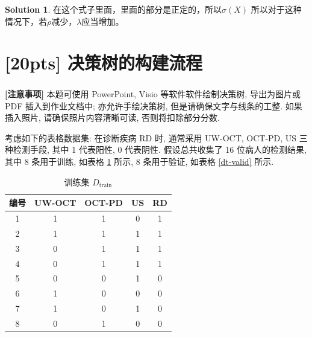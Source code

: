 \documentclass[a4paper]{article}
\numberwithin{equation}{section}
\theoremstyle{definition}
\newtheorem*{solution}{Solution}
\begin{document}
\begin{solution}
	在这个式子里面，里面的部分是正定的，所以$\sigma(X)$
	所以对于这种情况下，若$\rho$减少，$\lambda$应当增加。
\end{solution}

\newpage

\section{[20pts] 决策树的构建流程}

\begin{tcolorbox}
	\textbf{[注意事项]} 本题可使用 PowerPoint\textsuperscript{\textregistered}, Visio\textsuperscript{\textregistered} 等软件软件绘制决策树, 导出为图片或 PDF 插入到作业文档中; 亦允许手绘决策树, 但是请确保文字与线条的工整. 如果插入照片, 请确保照片内容清晰可读, 否则将扣除部分分数.
\end{tcolorbox}

考虑如下的表格数据集: 在诊断疾病 RD 时, 通常采用 UW-OCT, OCT-PD, US 三种检测手段, 其中 1 代表阳性, 0 代表阴性. 假设总共收集了 16 位病人的检测结果, 其中 8 条用于训练, 如表格 \ref{dt-train} 所示, 8 条用于验证, 如表格 \ref{dt-valid} 所示.

\begin{table}[ht]
	\centering
	\setlength{\abovecaptionskip}{0pt}
	\setlength{\belowcaptionskip}{5pt}
	\caption{训练集 $D_{\mathrm{train}}$}
	\label{dt-train}
	\begin{tabular}{cccc|c}
		\hline
		编号 & UW-OCT & OCT-PD & US & RD \\
		\hline
		1  & 1      & 1      & 0  & 1  \\
		2  & 1      & 1      & 1  & 1  \\
		3  & 0      & 1      & 1  & 1  \\
		4  & 0      & 1      & 1  & 1  \\
		5  & 0      & 0      & 1  & 0  \\
		6  & 1      & 0      & 0  & 0  \\
		7  & 1      & 0      & 1  & 0  \\
		8  & 0      & 1      & 0  & 0  \\
		\hline
	\end{tabular}
\end{table}
\end{document}
